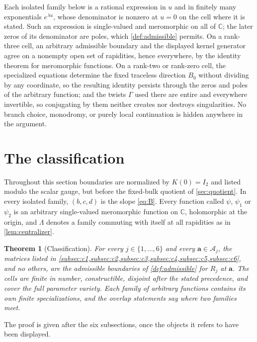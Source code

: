 \documentclass[11pt,reqno]{amsart}
\theoremstyle{plain}
\newtheorem{theorem}{Theorem}[section]
\theoremstyle{definition}
\theoremstyle{remark}
\numberwithin{equation}{section}
\newcommand{\C}{\mathbb C}
\newcommand{\Id}{I_2}
\begin{document}
Each isolated family below is a rational expression in $u$ and in finitely many
exponentials $e^{\lambda u}$, whose denominator is nonzero at $u=0$ on the cell
where it is stated. Such an expression is single-valued and meromorphic on all of
$\C$; the later zeros of its denominator are poles, which \cref{def:admissible}
permits. On a rank-three cell, an arbitrary admissible boundary and the displayed
kernel generator agree on a nonempty open set of rapidities, hence everywhere, by
the identity theorem for meromorphic functions. On a rank-two or rank-zero cell,
the specialized equations determine the fixed traceless direction $B_0$ without
dividing by any coordinate, so the resulting identity persists through the zeros
and poles of the arbitrary function; and the twists $\Gamma$ used there are
entire and everywhere invertible, so conjugating by them neither creates nor
destroys singularities. No branch choice, monodromy, or purely local continuation
is hidden anywhere in the argument.

\section{The classification}
\label{sec:classification}

Throughout this section boundaries are normalized by $K(0)=\Id$ and listed modulo
the scalar gauge, but before the fixed-bulk quotient of \cref{sec:quotient}. In
every isolated family, $(b,c,d)$ is the slope \cref{eq:B}. Every function called
$\psi$, $\psi_1$ or $\psi_2$ is an arbitrary single-valued meromorphic function
on $\C$, holomorphic at the origin, and $\Lambda$ denotes a family commuting with
itself at all rapidities as in \cref{lem:centralizer}.

\begin{theorem}[Classification]
\label{thm:raw}
For every $j\in\{1,\dots,6\}$ and every $\mathbf a\in\mathcal A_j$, the matrices
listed in \cref{subsec:c1,subsec:c2,subsec:c3,subsec:c4,subsec:c5,subsec:c6}, and
no others, are the admissible boundaries of \cref{def:admissible} for $R_j$ at
$\mathbf a$. The cells are finite in number, constructible, disjoint after the
stated precedence, and cover the full parameter variety. Each family of arbitrary
functions contains its own finite specializations, and the overlap statements say
where two families meet.
\end{theorem}

The proof is given after the six subsections, once the objects it refers to have
been displayed.
\end{document}
